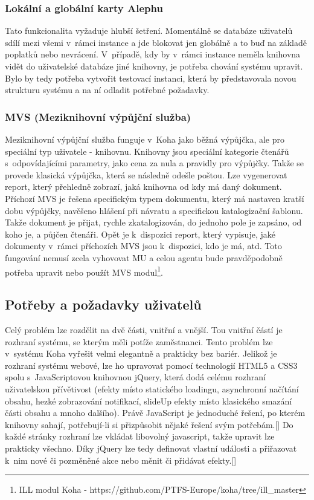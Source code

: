 \documentclass[
	11pt, oneside, printed, draft, 
	table,   %
	lof,     %
	lot     %
]{fithesis3}
\newcommand{\citepages}[2]{[\cite[#1]{#2}]}
\begin{document}
{\subsubsection{Lokální a globální karty Alephu}
Tato funkcionalita vyžaduje hlubší šetření. Momentálně se databáze uživatelů sdílí mezi všemi v~rámci instance a jde blokovat jen globálně a to buď na základě poplatků nebo nevrácení. V~případě, kdy by v~rámci instance neměla knihovna vidět do uživatelské databáze jiné knihovny, je potřeba chování systému upravit. Bylo by tedy potřeba vytvořit testovací instanci, která by představovala novou strukturu systému a na ní odladit potřebné požadavky.

\subsubsection{MVS (Meziknihovní výpůjční služba)}
Meziknihovní výpůjční služba funguje v~Koha jako běžná výpůjčka, ale pro speciální typ uživatele - knihovnu. Knihovny jsou speciální kategorie čtenářů s~odpovídajícími parametry, jako cena za nula a pravidly pro výpůjčky. Takže se provede klasická výpůjčka, která se následně odešle poštou. Lze vygenerovat report, který přehledně zobrazí, jaká knihovna od kdy má daný dokument. Příchozí MVS je řešena specifickým typem dokumentu, který má nastaven kratší dobu výpůjčky, navěšeno hlášení při návratu a specifickou katalogizační šablonu. Takže dokument je přijat, rychle zkatalogizován, do jednoho pole je zapsáno, od koho je, a půjčen čtenáři. Opět je k~dispozici report, který vypisuje, jaké dokumenty v~rámci příchozích MVS jsou k~dispozici, kdo je má, atd. Toto fungování nemusí zcela vyhovovat MU a celou agentu bude pravděpodobně potřeba upravit nebo použít MVS modul\footnote{ILL modul Koha - https://github.com/PTFS-Europe/koha/tree/ill\_master}.

\subsection{Potřeby a požadavky uživatelů}
Celý problém lze rozdělit na dvě části, vnitřní a vnější. Tou vnitřní částí je rozhraní systému, se kterým měli potíže zaměstnanci. Tento problém lze v~systému Koha vyřešit velmi elegantně a prakticky bez bariér. Jelikož je rozhraní systému webové, lze ho upravovat pomocí technologií HTML5 a CSS3 spolu s~JavaScriptovou knihovnou jQuery, která dodá celému rozhraní uživatelskou přívětivost (efekty místo statického loadingu, asynchronní načítání obsahu, hezké zobrazování notifikací, slideUp efekty místo klasického smazání části obsahu a mnoho dalšího). Právě JavaScript je jednoduché řešení, po kterém knihovny sahají, potřebují-li si přizpůsobit nějaké řešení svým potřebám.\citepages{80-82}{Denar2015thesis} Do každé stránky rozhraní lze vkládat libovolný javascript, takže upravit lze prakticky všechno. Díky jQuery lze tedy definovat  vlastní události a přiřazovat k~nim nové či pozměněné akce nebo měnit či přidávat efekty.\citepages{3-9}{IYiYMQHMhgWYsu4q}

}
\end{document}
